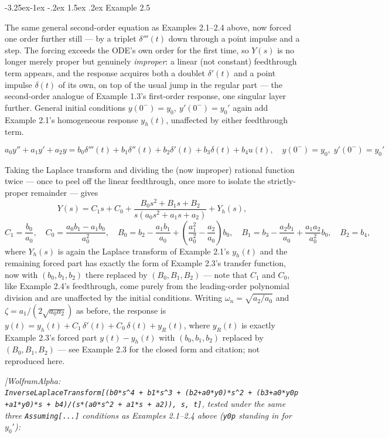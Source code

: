 \documentclass[
  11pt,
]{article}
\makeatletter
\renewcommand\paragraph{\@startsection{paragraph}{4}{\z@}%
                                     {-3.25ex\@plus -1ex \@minus -.2ex}%
                                     {1.5ex \@plus .2ex}%
                                     {\normalfont\normalsize\bfseries}}
\makeatother
\begin{document}
\hypertarget{example-2.5}{%
\paragraph{Example 2.5}\label{example-2.5}}

The same general second-order equation as Examples 2.1--2.4 above, now
forced one order further still --- by a triplet \(\delta'''(t)\) down
through a point impulse and a step. The forcing exceeds the ODE's own
order for the first time, so \(Y(s)\) is no longer merely proper but
genuinely \emph{improper}: a linear (not constant) feedthrough term
appears, and the response acquires both a doublet \(\delta'(t)\) and a
point impulse \(\delta(t)\) of its own, on top of the usual jump in the
regular part --- the second-order analogue of Example 1.3's first-order
response, one singular layer further. General initial conditions
\(y(0^-)=y_0,\ y'(0^-)=y_0'\) again add Example 2.1's homogeneous
response \(y_h(t)\), unaffected by either feedthrough term.

\[
a_0 y'' + a_1 y' + a_2 y = b_0 \delta'''(t) + b_1 \delta''(t) + b_2 \delta'(t) + b_3 \delta(t) + b_4 u(t), \quad y(0^-) = y_0, \; y'(0^-) = y_0'
\]

Taking the Laplace transform and dividing the (now improper) rational
function twice --- once to peel off the linear feedthrough, once more to
isolate the strictly-proper remainder --- gives \[
Y(s) = C_1 s + C_0 + \frac{B_0 s^2 + B_1 s + B_2}{s(a_0 s^2+a_1 s+a_2)} + Y_h(s),
\] \[
C_1 = \frac{b_0}{a_0}, \quad C_0 = \frac{a_0 b_1 - a_1 b_0}{a_0^2}, \quad B_0 = b_2 - \frac{a_1 b_1}{a_0} + \left(\frac{a_1^2}{a_0^2}-\frac{a_2}{a_0}\right) b_0, \quad B_1 = b_3 - \frac{a_2 b_1}{a_0} + \frac{a_1 a_2}{a_0^2} b_0, \quad B_2 = b_4,
\] where \(Y_h(s)\) is again the Laplace transform of Example 2.1's
\(y_h(t)\) and the remaining forced part has exactly the form of Example
2.3's transfer function, now with \((b_0,b_1,b_2)\) there replaced by
\((B_0,B_1,B_2)\) --- note that \(C_1\) and \(C_0\), like Example 2.4's
feedthrough, come purely from the leading-order polynomial division and
are unaffected by the initial conditions. Writing
\(\omega_n=\sqrt{a_2/a_0}\) and \(\zeta=a_1/(2\sqrt{a_0a_2})\) as
before, the response is
\(y(t) = y_h(t) + C_1\,\delta'(t) + C_0\,\delta(t) + y_R(t)\), where
\(y_R(t)\) is exactly Example 2.3's forced part \(y(t)-y_h(t)\) with
\((b_0,b_1,b_2)\) replaced by \((B_0,B_1,B_2)\) --- see Example 2.3 for
the closed form and citation; not reproduced here.

\emph{{[}WolframAlpha:
\texttt{InverseLaplaceTransform{[}(b0*s\^{}4\ +\ b1*s\^{}3\ +\ (b2+a0*y0)*s\^{}2\ +\ (b3+a0*y0p+a1*y0)*s\ +\ b4)/(s*(a0*s\^{}2\ +\ a1*s\ +\ a2)),\ s,\ t{]}},
tested under the same three \texttt{Assuming{[}...{]}} conditions as
Examples 2.1--2.4 above (\texttt{y0p} standing in for \(y_0'\)):}
\end{document}

